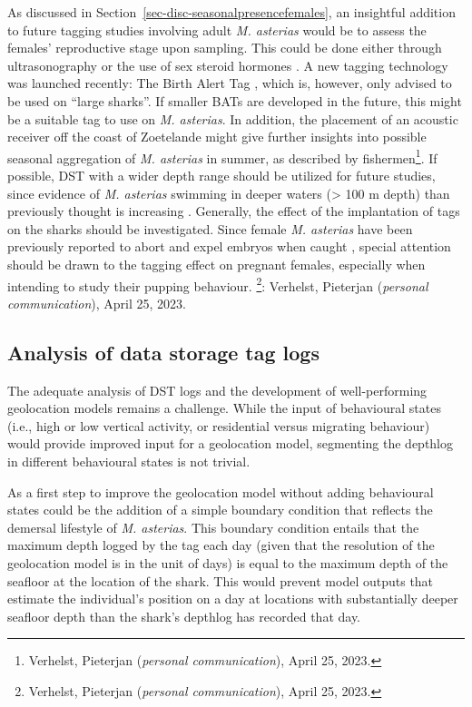 \documentclass[
  authoryear,
  review,
  3p]{elsarticle}
\begin{document}
As discussed in Section~\ref{sec-disc-seasonalpresencefemales}, an
insightful addition to future tagging studies involving adult \emph{M.
asterias} would be to assess the females' reproductive stage upon
sampling. This could be done either through ultrasonography or the use
of sex steroid hormones
\citep{awruch_2014, smukall_2019, anderson_2018, fujinami_2020, fujinami_2021}.
A new tagging technology was launched recently: The Birth Alert Tag
\citep[BAT,][]{sulikowski_2023}, which is, however, only advised to be
used on ``large sharks''. If smaller BATs are developed in the future,
this might be a suitable tag to use on \emph{M. asterias}. In addition,
the placement of an acoustic receiver off the coast of Zoetelande might
give further insights into possible seasonal aggregation of \emph{M.
asterias} in summer, as described by fishermen\footnote{Verhelst,
  Pieterjan (\emph{personal communication}), April 25, 2023.}. If
possible, DST with a wider depth range should be utilized for future
studies, since evidence of \emph{M. asterias} swimming in deeper waters
(\textgreater{} 100 m depth) than previously thought is increasing
\citep{ices_2019, griffiths_2020}. Generally, the effect of the
implantation of tags on the sharks should be investigated. Since female
\emph{M. asterias} have been previously reported to abort and expel
embryos when caught \citep{farrell_2010a}, special attention should be
drawn to the tagging effect on pregnant females, especially when
intending to study their pupping behaviour. \footnote{Verhelst,
  Pieterjan (\emph{personal communication}), April 25, 2023.}: Verhelst,
Pieterjan (\emph{personal communication}), April 25, 2023.

\hypertarget{analysis-of-data-storage-tag-logs}{%
\subsection{Analysis of data storage tag
logs}\label{analysis-of-data-storage-tag-logs}}

The adequate analysis of DST logs and the development of well-performing
geolocation models remains a challenge. While the input of behavioural
states (i.e., high or low vertical activity, or residential versus
migrating behaviour) would provide improved input for a geolocation
model, segmenting the depthlog in different behavioural states is not
trivial.

As a first step to improve the geolocation model without adding
behavioural states could be the addition of a simple boundary condition
that reflects the demersal lifestyle of \emph{M. asterias}. This
boundary condition entails that the maximum depth logged by the tag each
day (given that the resolution of the geolocation model is in the unit
of days) is equal to the maximum depth of the seafloor at the location
of the shark. This would prevent model outputs that estimate the
individual's position on a day at locations with substantially deeper
seafloor depth than the shark's depthlog has recorded that day.
\end{document}
